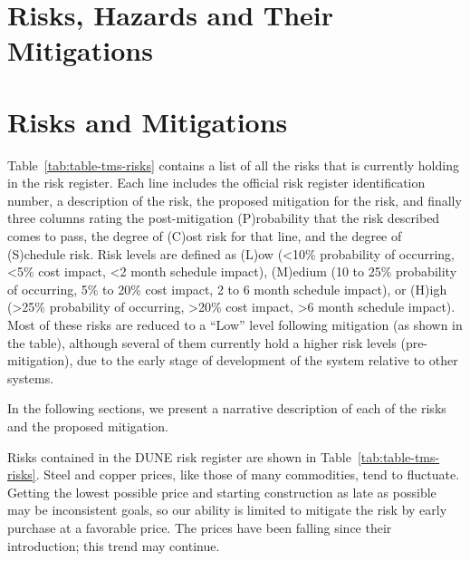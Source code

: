 \section{Risks, Hazards and Their Mitigations}
\label{sec:tms-risks-hazards}


\section{Risks and Mitigations}
\label{sec:tms-risks}

Table~\ref{tab:table-tms-risks} contains a list of all the
risks that  is currently holding in the  risk register.  Each line includes the official  risk register identification number, a description of the risk, the proposed mitigation for the risk, and finally three columns rating the post-mitigation (P)robability that the risk described comes to pass, the degree of (C)ost risk for that line, and the degree of (S)chedule risk.  Risk levels are defined as (L)ow (<10\% probability of occurring, <5\% cost impact, <2 month schedule impact), (M)edium (10 to 25\% probability of occurring, 5\% to 20\% cost impact, 2 to 6 month schedule impact), or (H)igh (>25\% probability of occurring, >20\% cost impact, >6 month schedule impact).  Most of these risks are reduced to a ``Low'' level following mitigation (as shown in the table), although several of them currently hold a higher risk levels (pre-mitigation), due to the early stage of development of the  system relative to other systems.  

In the following sections, we present a narrative description of each of the risks and the proposed mitigation.

%


Risks contained in the DUNE risk register are shown in Table~\ref{tab:table-tms-risks}. Steel and copper prices, like those of many commodities, tend to fluctuate. Getting the lowest possible price and starting construction as late as possible may be inconsistent goals, so our ability is limited to mitigate the risk by early purchase at a favorable price.  The  prices have been falling since their introduction; this trend may continue.


